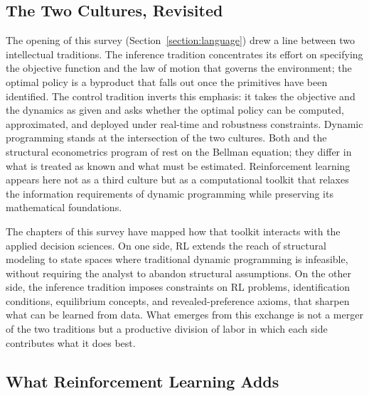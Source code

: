 
\subsection{The Two Cultures, Revisited}

The opening of this survey (Section~\ref{section:language}) drew a line between two intellectual traditions.
The inference tradition concentrates its effort on specifying the objective function and the law of motion that governs the environment; the optimal policy is a byproduct that falls out once the primitives have been identified.
The control tradition inverts this emphasis: it takes the objective and the dynamics as given and asks whether the optimal policy can be computed, approximated, and deployed under real-time and robustness constraints.
Dynamic programming stands at the intersection of the two cultures.
Both \citet{Bellman1957} and the structural econometrics program of \citet{Rust1987} rest on the Bellman equation; they differ in what is treated as known and what must be estimated.
Reinforcement learning appears here not as a third culture but as a computational toolkit that relaxes the information requirements of dynamic programming while preserving its mathematical foundations.

The chapters of this survey have mapped how that toolkit interacts with the applied decision sciences.
On one side, RL extends the reach of structural modeling to state spaces where traditional dynamic programming is infeasible, without requiring the analyst to abandon structural assumptions.
On the other side, the inference tradition imposes constraints on RL problems, identification conditions, equilibrium concepts, and revealed-preference axioms, that sharpen what can be learned from data.
What emerges from this exchange is not a merger of the two traditions but a productive division of labor in which each side contributes what it does best.

\subsection{What Reinforcement Learning Adds}


